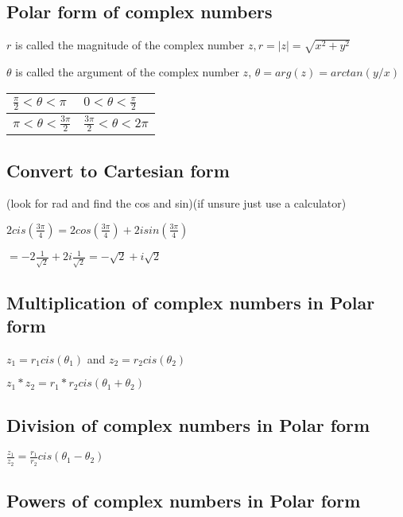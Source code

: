 \documentclass{extarticle}
\begin{document}
\begin{multicols}{4}
\subsection{Polar form of complex numbers}

$r$ is called the magnitude of the complex number $z, r=\left|z\right|=\sqrt{x^2+y^2}$

$\theta$ is called the argument of the complex number $z$, $\theta=arg\left(z\right)=arctan{\left(y/x\right)}$

\begin{tabu}{|X|X|}
    \hline
$\frac{\pi}{2}<\theta<\pi$ & $0<\theta<\frac{\pi}{2}$ \\ \hline
$\pi<\theta<\frac{3\pi}{2}$ & $\frac{3\pi}{2}<\theta<2\pi$ \\ \hline
    \end{tabu}







\subsection{Convert to Cartesian form}

(look for rad and find the cos and sin)(if unsure just use a calculator)

$2cis\left(\frac{3\pi}{4}\right)=2cos{\left(\frac{3\pi}{4}\right)}+2isin{\left(\frac{3\pi}{4}\right)}$

$=-2\frac{1}{\sqrt2}+2i\frac{1}{\sqrt2}=-\sqrt2+i\sqrt2$

\subsection{Multiplication of complex numbers in Polar form}

$z_1=r_1cis\left(\theta_1\right)$ and $z_2=r_2cis\left(\theta_2\right)$

$z_1\ast z_2=r_1\ast r_2cis\left(\theta_1+\theta_2\right)$

\subsection{Division of complex numbers in Polar form}

$\frac{z_1}{z_2}=\frac{r_1}{r_2}cis\left(\theta_1-\theta_2\right)$

\subsection{Powers of complex numbers in Polar form}


\end{multicols}
\end{document}
